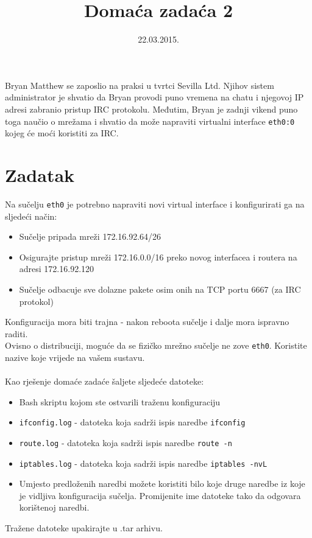 \documentclass[12pt,a4paper]{article}
\begin{document}
	\title{Domaća zadaća 2}
	\date{\vspace{-5ex} 22.03.2015.}
	\maketitle
	Bryan Matthew se zaposlio na praksi u tvrtci Sevilla Ltd. Njihov sistem administrator je shvatio da Bryan provodi puno vremena na chatu i njegovoj IP adresi zabranio pristup IRC protokolu. Međutim, Bryan je zadnji vikend puno toga naučio o mrežama i shvatio da može napraviti virtualni interface \texttt{eth0:0} kojeg će moći koristiti za IRC.
	\section*{Zadatak}
	Na sučelju \texttt{eth0} je potrebno napraviti novi virtual interface i konfigurirati ga na sljedeći način:
	\begin{itemize}
		\item Sučelje pripada mreži 172.16.92.64/26
		\item Osigurajte pristup mreži 172.16.0.0/16 preko novog interfacea i routera na adresi 172.16.92.120
		\item Sučelje odbacuje sve dolazne pakete osim onih na TCP portu 6667 (za IRC protokol)
	\end{itemize}
	Konfiguracija mora biti trajna - nakon reboota sučelje i dalje mora ispravno raditi.\\
	{\small Ovisno o distribuciji, moguće da se fizičko mrežno sučelje ne zove \texttt{eth0}. Koristite nazive koje vrijede na vašem sustavu.}\\
	\,\\
	Kao rješenje domaće zadaće šaljete sljedeće datoteke:
	\begin{itemize}
		\item Bash skriptu kojom ste ostvarili traženu konfiguraciju
		\item \texttt{ifconfig.log} - datoteka koja sadrži ispis naredbe \texttt{ifconfig}
		\item \texttt{route.log} - datoteka koja sadrži ispis naredbe \texttt{route -n}
		\item \texttt{iptables.log} - datoteka koja sadrži ispis naredbe \texttt{iptables -nvL}
		\item[] {\small Umjesto predloženih naredbi možete koristiti bilo koje druge naredbe iz koje je vidljiva konfiguracija sučelja. Promijenite ime datoteke tako da odgovara korištenoj naredbi.}
	\end{itemize}
	Tražene datoteke upakirajte u .tar arhivu.
	
\end{document}
